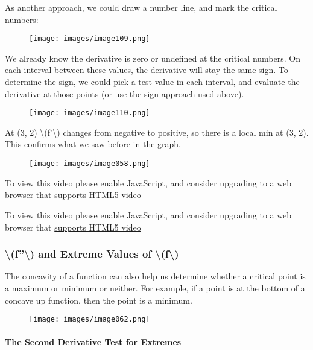 As another approach, we could draw a number line, and mark the critical
numbers:

\begin{figure}
\centering
\texttt{[image: images/image109.png]}
\caption{}
\end{figure}

We already know the derivative is zero or undefined at the critical
numbers. On each interval between these values, the derivative will stay
the same sign. To determine the sign, we could pick a test value in each
interval, and evaluate the derivative at those points (or use the sign
approach used above).

\begin{figure}
\centering
\texttt{[image: images/image110.png]}
\caption{}
\end{figure}

At (3, 2) \textbackslash{}(f'\textbackslash{}) changes from negative to
positive, so there is a local min at (3, 2). This confirms what we saw
before in the graph.

\begin{figure}
\centering
\texttt{[image: images/image058.png]}
\caption{}
\end{figure}

To view this video please enable JavaScript, and consider upgrading to a
web browser that \href{http://videojs.com/html5-video-support/}{supports
HTML5 video}

To view this video please enable JavaScript, and consider upgrading to a
web browser that \href{http://videojs.com/html5-video-support/}{supports
HTML5 video}

\hypertarget{f-and-extreme-values-of-f-1}{%
\subsubsection{\textbackslash{}(f''\textbackslash{}) and Extreme Values
of
\textbackslash{}(f\textbackslash{})}\label{f-and-extreme-values-of-f-1}}

The concavity of a function can also help us determine whether a
critical point is a maximum or minimum or neither. For example, if a
point is at the bottom of a concave up function, then the point is a
minimum.

\begin{figure}
\centering
\texttt{[image: images/image062.png]}
\caption{}
\end{figure}

\hypertarget{the-second-derivative-test-for-extremes}{%
\paragraph{The Second Derivative Test for
Extremes}\label{the-second-derivative-test-for-extremes}}


